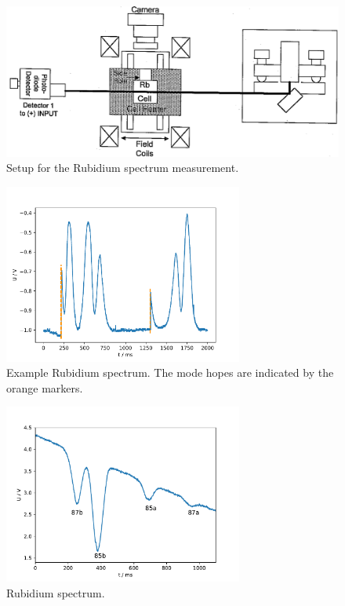\begin{figure}
  \centering
  \includegraphics[width=\textwidth]{Pics/setup_spectrum.png}
  \caption{Setup for the Rubidium spectrum measurement.\cite{anleitung}}
  \label{fig:setup_spectrum}
\end{figure}

\begin{figure}
  \centering
  \includegraphics[width=0.7\textwidth]{Pics/example_spectrum_hop.pdf}
  \caption{Example Rubidium spectrum. The mode hopes are indicated by the orange markers.}
  \label{fig:example}
\end{figure}

\FloatBarrier
\begin{figure}
  \centering
  \includegraphics[width=0.7\textwidth]{Pics/Rb_spectrum.pdf}
  \caption{Rubidium spectrum.}
  \label{fig:spectrum}
\end{figure}
\FloatBarrier

